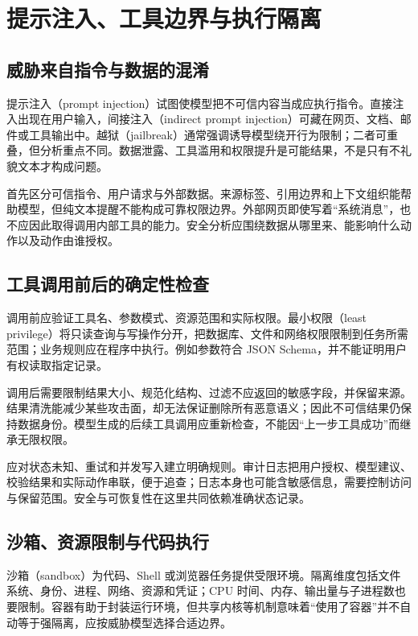 \setcounter{chapter}{19} %
\chapter{提示注入、工具边界与执行隔离}
\label{ch:safety}

\section{威胁来自指令与数据的混淆}

提示注入（prompt injection）试图使模型把不可信内容当成应执行指令。直接注入出现在用户输入，间接注入（indirect prompt injection）可藏在网页、文档、邮件或工具输出中。越狱（jailbreak）通常强调诱导模型绕开行为限制；二者可重叠，但分析重点不同。数据泄露、工具滥用和权限提升是可能结果，不是只有不礼貌文本才构成问题。

首先区分可信指令、用户请求与外部数据。来源标签、引用边界和上下文组织能帮助模型，但纯文本提醒不能构成可靠权限边界。外部网页即使写着“系统消息”，也不应因此取得调用内部工具的能力。安全分析应围绕数据从哪里来、能影响什么动作以及动作由谁授权。

\section{工具调用前后的确定性检查}

调用前应验证工具名、参数模式、资源范围和实际权限。最小权限（least privilege）将只读查询与写操作分开，把数据库、文件和网络权限限制到任务所需范围；业务规则应在程序中执行。例如参数符合 JSON Schema，并不能证明用户有权读取指定记录。

调用后需要限制结果大小、规范化结构、过滤不应返回的敏感字段，并保留来源。结果清洗能减少某些攻击面，却无法保证删除所有恶意语义；因此不可信结果仍保持数据身份。模型生成的后续工具调用应重新检查，不能因“上一步工具成功”而继承无限权限。

应对状态未知、重试和并发写入建立明确规则。审计日志把用户授权、模型建议、校验结果和实际动作串联，便于追查；日志本身也可能含敏感信息，需要控制访问与保留范围。安全与可恢复性在这里共同依赖准确状态记录。

\section{沙箱、资源限制与代码执行}

沙箱（sandbox）为代码、Shell 或浏览器任务提供受限环境。隔离维度包括文件系统、身份、进程、网络、资源和凭证；CPU 时间、内存、输出量与子进程数也要限制。容器有助于封装运行环境，但共享内核等机制意味着“使用了容器”并不自动等于强隔离，应按威胁模型选择合适边界。

